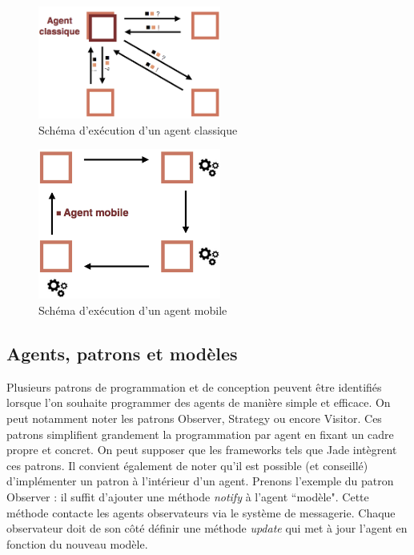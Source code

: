 \documentclass[conference]{IEEEtran}
\begin{document}
\begin{figure}[h]
\centering
\includegraphics[width=170pt]{images/classique.png}
\caption{Schéma d'exécution d'un agent classique}
\label{fig:classique}
\end{figure}

\begin{figure}[h]
\centering
\includegraphics[width=170pt]{images/mobile.png}
\caption{Schéma d'exécution d'un agent mobile}
\label{fig:mobile}
\end{figure}

\subsection{Agents, patrons et modèles}
\vspace*{1mm}

Plusieurs patrons de programmation et de conception peuvent être identifiés lorsque l'on souhaite programmer des agents de manière simple et efficace. On peut notamment noter les patrons Observer, Strategy ou encore Visitor. Ces patrons simplifient grandement la programmation par agent en fixant un cadre propre et concret. On peut supposer que les frameworks tels que Jade intègrent ces patrons. Il convient également de noter qu'il est possible (et conseillé) d'implémenter un patron à l'intérieur d'un agent. Prenons l'exemple du patron Observer : il suffit d'ajouter une méthode \textit{notify} à l'agent ``modèle". Cette méthode contacte les agents observateurs via le système de messagerie. Chaque observateur doit de son côté définir une méthode \textit{update} qui met à jour l'agent en fonction du nouveau modèle.\\
\end{document}
